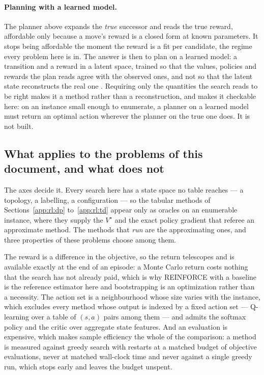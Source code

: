 \documentclass[11pt,a4paper]{article}
\begin{document}
\paragraph{Planning with a learned model.}
The planner above expands the \emph{true} successor and reads the true reward,
affordable only because a move's reward is a closed form at known parameters.
It stops being affordable the moment the reward is a fit per candidate, the
regime every problem here is in. The answer is then to plan on a learned model:
a transition and a reward in a latent space, trained so that the values,
policies and rewards the plan reads agree with the observed ones, and not so
that the latent state reconstructs the real one \citep{schrittwieser2020}.
Requiring only the quantities the search reads to be right makes it a method
rather than a reconstruction, and makes it checkable here: on an instance small
enough to enumerate, a planner on a learned model must return an optimal action
wherever the planner on the true one does. It is not built.

\subsection{What applies to the problems of this document, and what does not}
\label{app:rl:applies}

The axes decide it. Every search here has a state space no table reaches --- a
topology, a labelling, a configuration --- so the tabular methods of
Sections~\ref{app:rl:dp} to~\ref{app:rl:td} appear only as oracles on an
enumerable instance, where they supply the $V^{\star}$ and the exact policy
gradient that referee an approximate method. The methods that \emph{run} are
the approximating ones, and three properties of these problems choose among
them.

The reward is a difference in the objective, so the return telescopes and is
available exactly at the end of an episode: a Monte Carlo return costs nothing
that the search has not already paid, which is why REINFORCE with a baseline is
the reference estimator here and bootstrapping is an optimization rather than a
necessity. The action set is a neighbourhood whose size varies with the
instance, which excludes every method whose output is indexed by a fixed action
set --- Q-learning over a table of $(s,a)$ pairs among them --- and admits the
softmax policy and the critic over aggregate state features. And an evaluation
is expensive, which makes sample efficiency the whole of the comparison: a
method is measured against greedy search with restarts at a matched budget of
objective evaluations, never at matched wall-clock time and never against a
single greedy run, which stops early and leaves the budget unspent.
\end{document}
